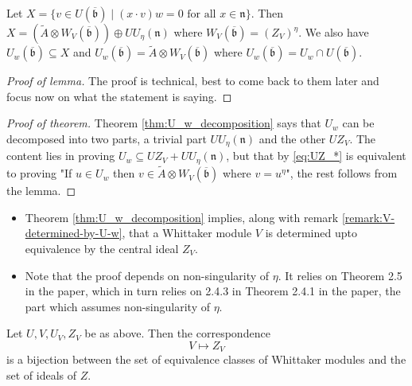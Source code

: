 \documentclass{article}
\theoremstyle{mytheoremstyle}
\theoremstyle{mytheoremstyle}
\theoremstyle{myproblemstyle}
\begin{document}
    \begin{lemma}
      Let $X = \{v \in U(\overline{\mathfrak b}) \mid (x \cdot v)w = 0 \text{ for all } x \in \mathfrak n\}$. Then 
      $X = (\tilde A \otimes W_V(\overline{\mathfrak b})) \oplus UU_\eta(\mathfrak n)$ where $W_V(\overline{\mathfrak b}) = (Z_V)^\eta$.
      We also have $U_w(\overline{\mathfrak b}) \subseteq X$ and $U_w(\overline{\mathfrak b}) = \tilde A \otimes W_V(\overline{\mathfrak b})$ 
      where $U_w(\overline{\mathfrak b}) = U_w \cap U(\overline{\mathfrak b})$.

    \end{lemma}

    \begin{proof}[Proof of lemma]
      The proof is technical, best to come back to them later and focus now on what the statement is saying.
    \end{proof}

    \begin{proof}[Proof of theorem]
    	Theorem \ref{thm:U_w_decomposition} says that $U_w$ can be decomposed into two parts, a trivial 
	part $UU_\eta(\mathfrak n)$ and the other $UZ_V$. The content lies in proving 
	$U_w \subseteq UZ_V + UU_\eta(\mathfrak n)$, but that by \eqref{eq:UZ_*} is equivalent to proving 
	"If $u\in U_w$ then $v \in \tilde A \otimes W_V(\overline{\mathfrak b})$ where $v = u^\eta$", the rest 
	follows from the lemma.

    \end{proof}


  \begin{remark}
    \hspace{1cm}
    \begin{itemize}
      \item Theorem \ref{thm:U_w_decomposition} implies, along with remark \ref{remark:V-determined-by-U-w},
	  that a Whittaker module $V$ is determined upto equivalence by the central ideal $Z_V$.
      \item Note that the proof depends on non-singularity of $\eta$. It relies on Theorem 2.5 in the paper, 
	which in turn relies on 2.4.3 in Theorem 2.4.1 in the paper, the part which assumes non-singularity of $\eta$. 
    \end{itemize}
  \end{remark} 
    

    \begin{theorem}
      Let $U, V, U_V, Z_V$ be as above. Then the correspondence 
      \begin{equation}
      	V \mapsto Z_V
      	\label{eq:correspondence}
      \end{equation}
      is a bijection between the set of equivalence classes of Whittaker modules and the set of ideals of $Z$.
    \end{theorem}
    
\end{document}
